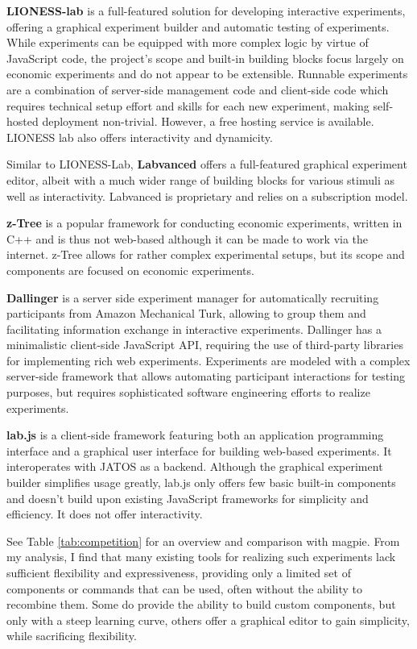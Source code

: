 \documentclass[a4paper,11pt]{scrreprt}
\begin{document}
\textbf{LIONESS-lab} \citep{Giamattei2020} is a full-featured solution for developing interactive experiments, offering a graphical experiment builder and automatic testing of experiments. While experiments can be equipped with more complex logic by virtue of JavaScript code, the project's scope and built-in building blocks focus largely on economic experiments and do not appear to be extensible. Runnable experiments are a combination of server-side management code and client-side code which requires technical setup effort and skills for each new experiment, making self-hosted deployment non-trivial. However, a free hosting service is available. LIONESS lab also offers interactivity and dynamicity.

Similar to LIONESS-Lab, \textbf{Labvanced} \citep{Scicovery2018} offers a full-featured graphical experiment editor, albeit with a much wider range of building blocks for various stimuli as well as interactivity. Labvanced is proprietary and relies on a subscription model.

\textbf{z-Tree} \citep{Fischbacher2010} is a popular framework for conducting economic experiments, written in C++ and is thus not web-based although it can be made to work via the internet. z-Tree allows for rather complex experimental setups, but its scope and components are focused on economic experiments.

\textbf{Dallinger} \citep{Suchow2016} is a server side experiment manager for automatically recruiting participants from Amazon Mechanical Turk, allowing to group them and facilitating information exchange in interactive experiments. Dallinger has a minimalistic client-side JavaScript API, requiring the use of third-party libraries for implementing rich web experiments. Experiments are modeled with a complex server-side framework that allows automating participant interactions for testing purposes, but requires sophisticated software engineering efforts to realize experiments.

\textbf{lab.js} \citep{Henninger2020} is a client-side framework featuring both an application programming interface and a graphical user interface  for building web-based experiments. It interoperates with JATOS \citep{Lange2015} as a backend. Although the graphical experiment builder simplifies usage greatly, lab.js only offers few basic built-in components and doesn't build upon existing JavaScript frameworks for simplicity and efficiency. It does not offer interactivity.

See Table \ref{tab:competition} for an overview and comparison with magpie. From my analysis, I find that many existing tools for realizing such experiments lack sufficient flexibility and expressiveness, providing only a limited set of components or commands that can be used, often without the ability to recombine them. Some do provide the ability to build custom components, but only with a steep learning curve, others offer a graphical editor to gain simplicity, while sacrificing flexibility.
\end{document}
